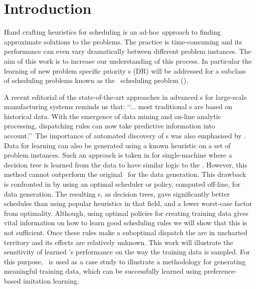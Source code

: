 \documentclass[smallextended]{svjour3}
\begin{document}
	
	\section{Introduction}\label{sec:introduction}
	
	Hand crafting heuristics for scheduling is an ad-hoc approach to finding 
	approximate solutions to the problems. The practice is time-consuming and its 
	performance can even vary dramatically between different problem instances. The 
	aim of this work is to increase our understanding of this process. In 
	particular the learning of new problem specific priority \dr s (DR) will be 
	addressed for a subclass of scheduling problems known as the \jsp\ scheduling 
	problem (\JSP). 
	
	A recent editorial of the state-of-the-art approaches \cite{Chen13} in advanced 
	\dr s for large-scale manufacturing systems reminds us that:
	\lq\lq ... most traditional \dr s are based on historical data. 
	With the emergence of data mining and on-line analytic processing, dispatching 
	rules can now take predictive information into account.\rq\rq~The importance of 
	automated discovery of \dr s was also emphasised by \cite{Monch13}. 
	Data for learning can also be generated using a known heuristic on a set of 
	problem instances.
	Such an approach is taken in \cite{Siggi05} for single-machine where
	a decision tree is learned from the data to have similar logic to the \dr.  
	However, this method cannot outperform the original \dr\ for the data generation. 
	This drawback is confronted in \cite{Malik08,Russell09,Siggi10} by using an 
	optimal scheduler or policy, computed off-line, for data generation. The 
	resulting \dr s, as decision trees, gave significantly better schedules than using popular 
	heuristics in that field, and a lower worst-case factor from optimality. 
	Although, using optimal policies for creating training data gives vital 
	information on how to learn good scheduling rules we will show that this is 
	not sufficient. Once these rules make a suboptimal dispatch the are in uncharted 
	territory and its effects are relatively unknown.  
	This work will illustrate the sensitivity of learned \dr's performance on the 
	way 
	the training data is sampled.
	For this purpose, \JSP\ is used as a case study to illustrate a methodology for 
	generating meaningful training data, which can be successfully 
	learned using preference-based imitation learning.
	
\end{document}
